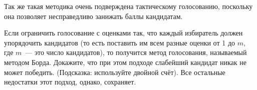 Так же такая методика очень подверждена тактическому голосованию, поскольку она позволяет несправедливо занижать баллы кандидатам.

\begin{exercise}
Если ограничить голосование с оценками так, что каждый избиратель должен упорядочить кандидатов (то есть поставить им всем разные оценки от 1 до $m$, где $m$~--- это число кандидатов), то получится метод голосования, называемый методом Борда. Докажите, что при этом подходе слабейший кандидат никак не может победить. (Подсказка: используйте двойной счёт). Все остальные недостатки этот подход, однако, сохраняет.
\end{exercise}


